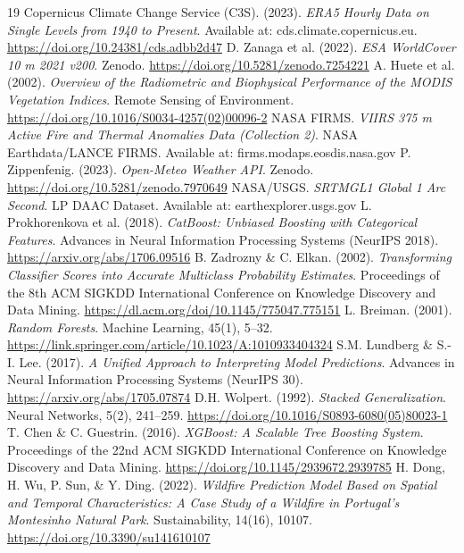 \documentclass[11pt]{article}
\begin{document}
\begin{thebibliography}{19}
 Copernicus Climate Change Service (C3S). (2023). \textit{ERA5 Hourly Data on Single Levels from 1940 to Present}. Available at: cds.climate.copernicus.eu. \url{https://doi.org/10.24381/cds.adbb2d47}
 D. Zanaga et al. (2022). \textit{ESA WorldCover 10 m 2021 v200}. Zenodo. \url{https://doi.org/10.5281/zenodo.7254221}
 A. Huete et al. (2002). \textit{Overview of the Radiometric and Biophysical Performance of the MODIS Vegetation Indices}. Remote Sensing of Environment. \url{https://doi.org/10.1016/S0034-4257(02)00096-2}
 NASA FIRMS. \textit{VIIRS 375 m Active Fire and Thermal Anomalies Data (Collection 2)}. NASA Earthdata/LANCE FIRMS. Available at: firms.modaps.eosdis.nasa.gov
 P. Zippenfenig. (2023). \textit{Open-Meteo Weather API}. Zenodo. \url{https://doi.org/10.5281/zenodo.7970649}
 NASA/USGS. \textit{SRTMGL1 Global 1 Arc Second}. LP DAAC Dataset. Available at: earthexplorer.usgs.gov
 L. Prokhorenkova et al. (2018). \textit{CatBoost: Unbiased Boosting with Categorical Features}. Advances in Neural Information Processing Systems (NeurIPS 2018). \url{https://arxiv.org/abs/1706.09516}
 B. Zadrozny \& C. Elkan. (2002). \textit{Transforming Classifier Scores into Accurate Multiclass Probability Estimates}. Proceedings of the 8th ACM SIGKDD International Conference on Knowledge Discovery and Data Mining. \url{https://dl.acm.org/doi/10.1145/775047.775151}
 L. Breiman. (2001). \textit{Random Forests}. Machine Learning, 45(1), 5--32. \url{https://link.springer.com/article/10.1023/A:1010933404324}
 S.M. Lundberg \& S.-I. Lee. (2017). \textit{A Unified Approach to Interpreting Model Predictions}. Advances in Neural Information Processing Systems (NeurIPS 30). \url{https://arxiv.org/abs/1705.07874}
 D.H. Wolpert. (1992). \textit{Stacked Generalization}. Neural Networks, 5(2), 241--259. \url{https://doi.org/10.1016/S0893-6080(05)80023-1}
 T. Chen \& C. Guestrin. (2016). \textit{XGBoost: A Scalable Tree Boosting System}. Proceedings of the 22nd ACM SIGKDD International Conference on Knowledge Discovery and Data Mining. \url{https://doi.org/10.1145/2939672.2939785}
 H. Dong, H. Wu, P. Sun, \& Y. Ding. (2022). \textit{Wildfire Prediction Model Based on Spatial and Temporal Characteristics: A Case Study of a Wildfire in Portugal's Montesinho Natural Park}. Sustainability, 14(16), 10107. \url{https://doi.org/10.3390/su141610107}

\end{thebibliography}
\end{document}
